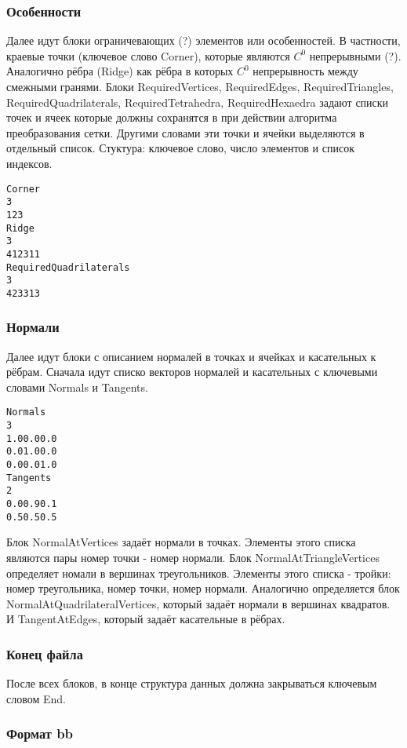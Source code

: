 \documentclass[a4paper,12pt]{article}
\begin{document}
\subsubsection{Особенности}

Далее идут блоки ограничевающих (?) элементов или особенностей. В частности, краевые точки (ключевое слово Corner), которые являются $C^0$ непрерывными (?). Аналогично рёбра (Ridge) как рёбра в которых $C^0$ непрерывность между смежными гранями.
Блоки RequiredVertices, RequiredEdges, RequiredTriangles, RequiredQuadrilaterals, RequiredTetrahedra, RequiredHexaedra задают списки точек и ячеек которые должны сохранятся в при действии алгоритма преобразования сетки. Другими словами эти точки и ячейки выделяются в отдельный список. Стуктура: ключевое слово, число элементов и список индексов.
\begin{alltt}
Corner
3
1 2 3
Ridge
3
41 23 11
RequiredQuadrilaterals
3
42 33 13
\end{alltt}

\subsubsection{Нормали}

Далее идут блоки с описанием нормалей в точках и ячейках и касательных к рёбрам.
Сначала идут списко векторов нормалей и касательных с ключевыми словами Normals и Tangents.
\begin{alltt}
Normals
3
1.0 0.0 0.0
0.0 1.0 0.0
0.0 0.0 1.0
Tangents
2
0.0 0.9 0.1
0.5 0.5 0.5
\end{alltt}

Блок NormalAtVertices задаёт нормали в точках. Элементы этого списка являются пары номер точки - номер нормали.
Блок NormalAtTriangleVertices определяет номали в вершинах треугольников. Элементы этого списка - тройки: номер треугольника, номер точки, номер нормали. Аналогично определяется блок NormalAtQuadrilateralVertices, который задаёт нормали в вершинах квадратов. И TangentAtEdges, который задаёт касательные в рёбрах.


\subsubsection{Конец файла}

После всех блоков, в конце структура данных должна закрываться ключевым словом End.


\subsubsection{Формат bb}
\end{document}
